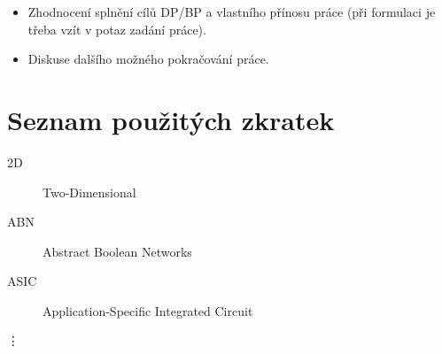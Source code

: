 \documentclass[11pt,twoside,a4paper]{book}
\begin{document}
\begin{itemize}
\item Zhodnocení splnění cílů DP/BP a  vlastního přínosu práce (při formulaci je třeba vzít v potaz zadání práce).
\item Diskuse dalšího možného pokračování práce.
\end{itemize} 


%




%
\def\CS{$\cal C\kern-0.1667em\lower.5ex\hbox{$\cal S$}\kern-0.075em $}


%

\appendix

\chapter{Seznam použitých zkratek}

\begin{description}
\item[2D] Two-Dimensional
\item[ABN] Abstract Boolean Networks
\item[ASIC] Application-Specific Integrated Circuit
\end{description}
\vdots
\end{document}
